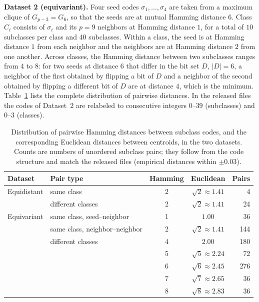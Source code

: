 \documentclass[../ppgc-tese.tex]{subfiles}
\begin{document}
\noindent\textbf{Dataset 2 (equivariant).}
Four seed codes $\sigma_1, \dots, \sigma_4$ are taken from a maximum clique of $G_{p-3} = G_6$, so that the seeds are at mutual Hamming distance $6$. Class $C_i$ consists of $\sigma_i$ and its $p = 9$ neighbors at Hamming distance $1$, for a total of $10$ subclasses per class and $40$ subclasses. Within a class, the seed is at Hamming distance $1$ from each neighbor and the neighbors are at Hamming distance $2$ from one another. Across classes, the Hamming distance between two subclasses ranges from $4$ to $8$: for two seeds at distance $6$ that differ in the bit set $D$, $|D| = 6$, a neighbor of the first obtained by flipping a bit of $D$ and a neighbor of the second obtained by flipping a different bit of $D$ are at distance $4$, which is the minimum. Table~\ref{tab:distance-structure} lists the complete distribution of pairwise distances. In the released files the codes of Dataset~2 are relabeled to consecutive integers $0$--$39$ (subclasses) and $0$--$3$ (classes).

\begin{table}[ht]
    \centering
    \caption{Distribution of pairwise Hamming distances between subclass codes, and the corresponding Euclidean distances between centroids, in the two datasets. Counts are numbers of unordered subclass pairs; they follow from the code structure and match the released files (empirical distances within $\pm 0.03$).}
    \label{tab:distance-structure}
    \begin{tabular}{llccr}
        \toprule
        Dataset & Pair type & Hamming & Euclidean & Pairs \\
        \midrule
        Equidistant & same class & 2 & $\sqrt{2} \approx 1.41$ & 4 \\
                    & different classes & 2 & $\sqrt{2} \approx 1.41$ & 24 \\
        \midrule
        Equivariant & same class, seed--neighbor & 1 & $1.00$ & 36 \\
                    & same class, neighbor--neighbor & 2 & $\sqrt{2} \approx 1.41$ & 144 \\
                    & different classes & 4 & $2.00$ & 180 \\
                    &  & 5 & $\sqrt{5} \approx 2.24$ & 72 \\
                    &  & 6 & $\sqrt{6} \approx 2.45$ & 276 \\
                    &  & 7 & $\sqrt{7} \approx 2.65$ & 36 \\
                    &  & 8 & $\sqrt{8} \approx 2.83$ & 36 \\
        \bottomrule
    \end{tabular}
\end{table}
\end{document}
